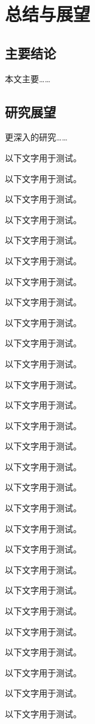 

\chapter{总结与展望}
\thispagestyle{others}
\pagestyle{others}
\xiaosi

\section{主要结论}

本文主要……

\section{研究展望}

更深入的研究……

以下文字用于测试。

以下文字用于测试。

以下文字用于测试。

以下文字用于测试。

以下文字用于测试。

以下文字用于测试。

以下文字用于测试。

以下文字用于测试。

以下文字用于测试。

以下文字用于测试。

以下文字用于测试。

以下文字用于测试。

以下文字用于测试。

以下文字用于测试。

以下文字用于测试。

以下文字用于测试。

以下文字用于测试。

以下文字用于测试。

以下文字用于测试。

以下文字用于测试。

以下文字用于测试。

以下文字用于测试。

以下文字用于测试。

以下文字用于测试。

以下文字用于测试。

以下文字用于测试。

以下文字用于测试。

以下文字用于测试。

